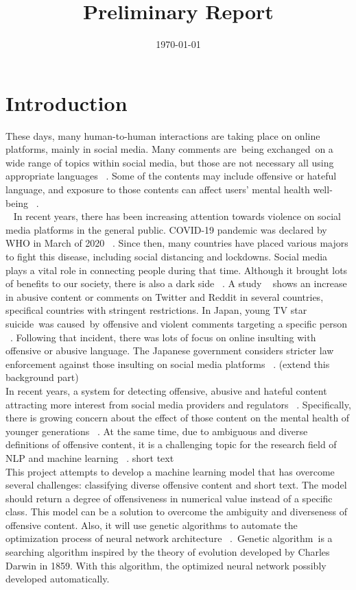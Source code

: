 \documentclass[12pt, natbib=false]{article}
\date{\today}
\title{Preliminary Report}
\begin{document}
\maketitle

\section{Introduction}
These days, many human-to-human interactions are taking place on online platforms, mainly in social media. Many comments are being exchanged on a wide range of topics within social media, but those are not necessary all using appropriate languages ~\cite{hada2021ruddit}. Some of the contents may include offensive or hateful language, and exposure to those contents can affect users’ mental health well-being ~\cite{hada2021ruddit}. \\ 
In recent years, there has been increasing attention towards violence on social media platforms in the general public. COVID-19 pandemic was declared by WHO in March of 2020 ~\cite{whoCovid}. Since then, many countries have placed various majors to fight this disease, including social distancing and lockdowns. Social media plays a vital role in connecting people during that time. Although it brought lots of benefits to our society, there is also a dark side ~\cite{liu2021covid}. A study ~\cite{babvey2021using} shows an increase in abusive content or comments on Twitter and Reddit in several countries, specifical countries with stringent restrictions. In Japan, young TV star suicide was caused by offensive and violent comments targeting a specific person ~\cite{HanaK}. Following that incident, there was lots of focus on online insulting with offensive or abusive language. The Japanese government considers stricter law enforcement against those insulting on social media platforms ~\cite{JpGov}. (extend this background part) \\
In recent years, a system for detecting offensive, abusive and hateful content attracting more interest from social media providers and regulators ~\cite{vidgen2019challenges}. Specifically, there is growing concern about the effect of those content on the mental health of younger generations ~\cite{babvey2021using}. At the same time, due to ambiguous and diverse definitions of offensive content, it is a challenging topic for the research field of NLP and machine learning ~\cite{vidgen2019challenges}. short text \\
This project attempts to develop a machine learning model that has overcome several challenges: classifying diverse offensive content and short text. The model should return a degree of offensiveness in numerical value instead of a specific class. This model can be a solution to overcome the ambiguity and diverseness of offensive content. Also, it will use genetic algorithms to automate the optimization process of neural network architecture ~\cite{andersen2021evolving}. Genetic algorithm is a searching algorithm inspired by the theory of evolution developed by Charles Darwin in 1859. With this algorithm, the optimized neural network possibly developed automatically. \\
\end{document}
